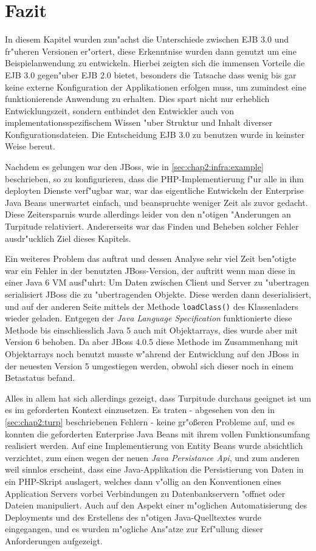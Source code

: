 \section{Fazit}
\label{sec:chap2:fazit}

In diesem Kapitel wurden zun"achst die Unterschiede zwischen EJB 3.0 und fr"uheren Versionen er"ortert, diese Erkenntnise 
wurden dann genutzt um eine Beispielanwendung zu entwickeln. Hierbei zeigten sich die immensen Vorteile die EJB 3.0 gegen"uber
EJB 2.0 bietet, besonders die Tatsache dass wenig bis gar keine externe Konfiguration der Applikationen erfolgen
muss, um zumindest eine funktionierende Anwendung zu erhalten. Dies spart nicht nur erheblich Entwicklungszeit,
sondern entbindet den Entwickler auch von implementationsspezifischem Wissen "uber Struktur und Inhalt diverser
Konfigurationsdateien. Die Entscheidung EJB 3.0 zu benutzen wurde in keinster Weise bereut.

Nachdem es gelungen war den JBoss, wie in \ref{sec:chap2:infra:example} beschrieben, so zu konfigurieren, dass
die PHP-Implementierung f"ur alle in ihm deployten Dienste verf"ugbar war, war das eigentliche Entwickeln der
Enterprise Java Beans unerwartet einfach, und beanspruchte weniger Zeit als zuvor gedacht. Diese Zeitersparnis
wurde allerdings leider von den n"otigen "Anderungen an Turpitude relativiert. Andererseits war
das Finden und Beheben solcher Fehler ausdr"ucklich Ziel dieses Kapitels.

Ein weiteres Problem das auftrat und dessen Analyse sehr viel Zeit ben"otigte war ein Fehler in der benutzten JBoss-Version, 
der auftritt wenn man diese in einer Java 6 VM ausf"uhrt:
Um Daten zwischen Client und Server zu "ubertragen serialisiert JBoss die zu "ubertragenden Objekte. Diese
werden dann deserialisiert, und auf der anderen Seite mittels der Methode \texttt{loadClass()} des Klassenladers wieder geladen.
Entgegen der \emph{Java Language Specification} funktionierte diese Methode bis einschliesslich Java 5 auch mit Objektarrays,
dies wurde aber mit Version 6 behoben. Da aber JBoss 4.0.5 diese Methode im Zusammenhang mit Objektarrays noch benutzt
musste w"ahrend der Entwicklung auf den JBoss in der neuesten Version 5 umgestiegen werden, obwohl sich dieser noch
in einem Betastatus befand.

Alles in allem hat sich allerdings gezeigt, dass Turpitude durchaus geeignet ist um es im geforderten Kontext
einzusetzen. Es traten - abgesehen von den in \ref{sec:chap2:turp} beschriebenen Fehlern - keine gr"o\ss eren Probleme
auf, und es konnten die geforderten Enterprise Java Beans mit ihrem vollen Funktionsumfang realisiert werden.
Auf eine Implementierung von Entity Beans wurde absichtlich verzichtet, zum einen wegen der neuen \emph{Java Persistance Api},
und zum anderen weil sinnlos erscheint, dass eine Java-Applikation die Persistierung von Daten in ein
PHP-Skript auslagert, welches dann v"ollig an den Konventionen eines Application Servers vorbei Verbindungen zu Datenbankservern
"offnet oder Dateien manipuliert.
Auch auf den Aspekt einer m"oglichen Automatisierung des Deployments und des Erstellens des n"otigen Java-Quelltextes
wurde eingegangen, und es wurden m"ogliche Ans"atze zur Erf"ullung dieser Anforderungen aufgezeigt.

